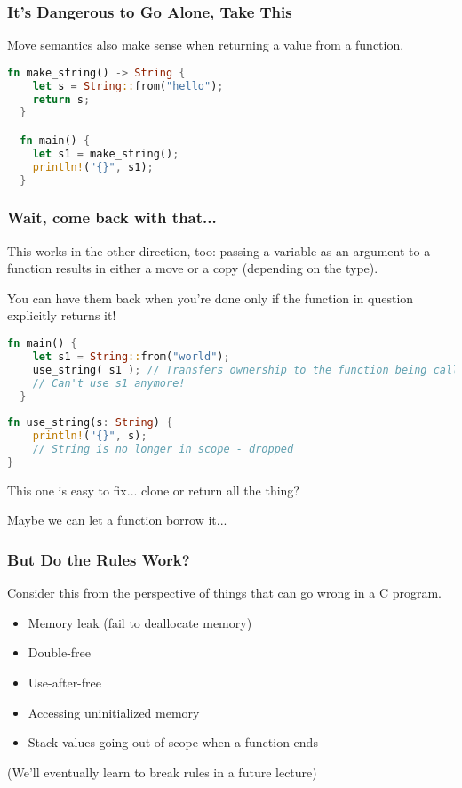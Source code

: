 \begin{frame}[fragile]
\frametitle{It's Dangerous to Go Alone, Take This}

Move semantics also make sense when returning a value from a function.

\begin{lstlisting}[language=Rust]
  fn make_string() -> String {
    let s = String::from("hello");
    return s;
  }

  fn main() {
    let s1 = make_string();
    println!("{}", s1);
  }
\end{lstlisting}

\end{frame}


\begin{frame}[fragile]
\frametitle{Wait, come back with that...}

This works in the other direction, too: passing a variable as an argument to a function results in either a move or a copy (depending on the type).

You can have them back when you're done only if the function in question explicitly returns it! 


\begin{lstlisting}[language=Rust]
  fn main() {
    let s1 = String::from("world");
	use_string( s1 ); // Transfers ownership to the function being called
	// Can't use s1 anymore!
  }
  
fn use_string(s: String) {
    println!("{}", s); 
    // String is no longer in scope - dropped
}
\end{lstlisting}

This one is easy to fix... clone or return all the thing?

Maybe we can let a function borrow it...

\end{frame}


\begin{frame}
\frametitle{But Do the Rules Work?}

Consider this from the perspective of things that can go wrong in a C program.

\begin{itemize}
	\item Memory leak (fail to deallocate memory)
	\item Double-free
	\item Use-after-free
	\item Accessing uninitialized memory
	\item Stack values going out of scope when a function ends
\end{itemize}

(We'll eventually learn to break rules in a future lecture)

\end{frame}


